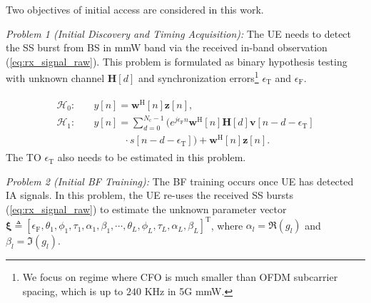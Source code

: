 \documentclass[journal]{IEEEtran}
\newcommand{\hermitian}[0]{\text{H}}
\newcommand{\transpose}[0]{\text{T}}
\newcommand{\CFO}[0]{\epsilon_{\text{F}}}
\newcommand{\STO}[0]{\epsilon_{\text{T}}}
\newcommand{\sigman}[0]{\sigma_{\text{n}}}
\begin{document}
Two objectives of initial access are considered in this work.

\textit{Problem 1 (Initial Discovery and Timing Acquisition):} The UE needs to detect the SS burst from BS in mmW band via the received in-band observation (\ref{eq:rx_signal_raw}). This problem is formulated as binary hypothesis testing with unknown channel $\mathbf{H}[d]$ and synchronization errors\footnote{We focus on regime where CFO is much smaller than OFDM subcarrier spacing, which is up to $240$ KHz in 5G mmW.} $\STO$ and $\CFO$.

\begin{align}
\begin{split}
\mathcal{H}_0: \quad & y[n] = \mathbf{w}^{\hermitian}[n]\mathbf{z}[n],\\
\mathcal{H}_1:\quad & y[n] =  \sum_{d=0}^{N_\text{c}-1}\bigg(e^{j\CFO n}\mathbf{w}^{\hermitian}[n]\mathbf{H}[d]\mathbf{v}[n-d-\epsilon_{\text{T}}]\\
&\quad\quad\quad \cdot s[n-d-\epsilon_{\text{T}}]\bigg)+ \mathbf{w}^{\hermitian}[n]\mathbf{z}[n].
\end{split}
\end{align}
The TO $\STO$ also needs to be estimated in this problem. 

\textit{Problem 2 (Initial BF Training):} The BF training occurs once UE has detected IA signals. In this problem, the UE re-uses the received SS bursts (\ref{eq:rx_signal_raw}) to estimate the unknown parameter vector $\boldsymbol{\xi} \triangleq [\epsilon_{\text{F}},\theta_1,\phi_1,\tau_1,\alpha_1,\beta_1,\cdots,\theta_L,\phi_L,\tau_L,\alpha_L,\beta_L]^\transpose$, where $\alpha_l = \Re(g_l)$ and $\beta_l = \Im(g_l)$.
\end{document}
